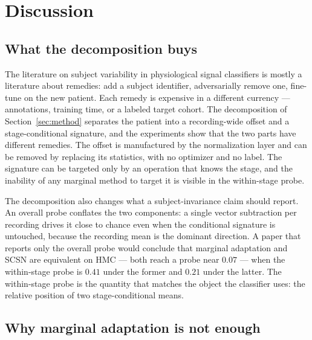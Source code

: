 \section{Discussion}
\label{sec:discussion}

\subsection{What the decomposition buys}

The literature on subject variability in physiological signal classifiers is
mostly a literature about remedies: add a subject identifier, adversarially
remove one, fine-tune on the new patient. Each remedy is expensive in a
different currency --- annotations, training time, or a labeled target
cohort. The decomposition of Section~\ref{sec:method} separates the patient
into a recording-wide offset and a stage-conditional signature, and the
experiments show that the two parts have different remedies. The offset is
manufactured by the normalization layer and can be removed by replacing its
statistics, with no optimizer and no label. The signature can be targeted only
by an operation that knows the stage, and the inability of any marginal method
to target it is visible in the within-stage probe.

The decomposition also changes what a subject-invariance claim should report.
An overall probe conflates the two components: a single vector subtraction
per recording drives it close to chance even when the conditional signature
is untouched, because the recording mean is the dominant direction. A paper
that reports only the overall probe would conclude that marginal adaptation
and SCSN are equivalent on HMC --- both reach a probe near $0.07$ --- when
the within-stage probe is $0.41$ under the former and $0.21$ under the
latter. The within-stage probe is the quantity that matches the object the
classifier uses: the relative position of two stage-conditional means.

\subsection{Why marginal adaptation is not enough}

